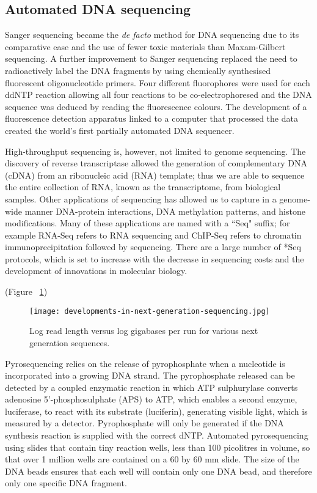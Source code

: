 \subsection{Automated DNA sequencing}

Sanger sequencing became the \textit{de facto} method for DNA sequencing due to its comparative ease and the use of fewer toxic materials than Maxam-Gilbert sequencing. A further improvement to Sanger sequencing replaced the need to radioactively label the DNA fragments by using chemically synthesised fluorescent oligonucleotide primers\cite{pmid3713851}. Four different fluorophores were used for each ddNTP reaction allowing all four reactions to be co-electrophoresed and the DNA sequence was deduced by reading the fluorescence colours. The development of a fluorescence detection apparatus linked to a computer that processed the data created the world's first partially automated DNA sequencer\cite{pmid3713851}.

High-throughput sequencing is, however, not limited to genome sequencing. The discovery of reverse transcriptase\cite{pmid4316300, pmid4316301} allowed the generation of complementary DNA (cDNA) from an ribonucleic acid (RNA) template; thus we are able to sequence the entire collection of RNA, known as the transcriptome, from biological samples. Other applications of sequencing has allowed us to capture in a genome-wide manner DNA-protein interactions, DNA methylation patterns, and histone modifications\cite{applicationsofsequencing}. Many of these applications are named with a ``Seq" suffix; for example RNA-Seq refers to RNA sequencing and ChIP-Seq refers to chromatin immunoprecipitation followed by sequencing. There are a large number of *Seq protocols\cite{pachter2014seq}, which is set to increase with the decrease in sequencing costs and the development of innovations in molecular biology.

(Figure ~\ref{fig:dev_next_gen})

\begin{figure}[h]
   \centering
   \texttt{[image: developments-in-next-generation-sequencing.jpg]}
   \caption[Developments in next generation sequencing]{Log read length versus log gigabases per run for various next generation sequences\cite{Nederbragt2012}.}
   \label{fig:dev_next_gen}
\end{figure}

Pyrosequencing relies on the release of pyrophosphate when a nucleotide is incorporated into a growing DNA strand. The pyrophosphate released can be detected by a coupled enzymatic reaction in which ATP sulphurylase converts adenosine 5'-phosphosulphate (APS) to ATP, which enables a second enzyme, luciferase, to react with its substrate (luciferin), generating visible light, which is measured by a detector. Pyrophosphate will only be generated if the DNA synthesis reaction is supplied with the correct dNTP. Automated pyrosequencing using slides that contain tiny reaction wells, less than 100 picolitres in volume, so that over 1 million wells are contained on a 60 by 60 mm slide. The size of the DNA beads ensures that each well will contain only one DNA bead, and therefore only one specific DNA fragment.

